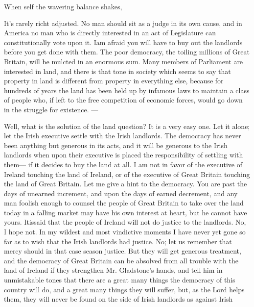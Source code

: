 \documentclass[11pt,openany]{book}
\begin{document}
When self the wavering balance shakes,

It's rarely richt adjusted. No man should sit as a judge in its own cause, and in America no man who is directly interested in an act of Legislature can constitutionally vote upon it. Iam afraid you will have to buy out the landlords before you get done with them. The poor democracy, the toiling millions of Great Britain, will be mulcted in an enormous sum. Many members of Parliament are interested in land, and there is that tone in society which seems to say that property in land is different from property in everything else, because for hundreds of years the land has been held up by infamous laws to maintain a class of people who, if left to the free competition of economic forces, would go down in the struggle for existence. ---

Well, what is the solution of the land question? It is a very easy one. Let it alone; let the Irish executive settle with the Irish landlords. The democracy has never been anything but generous in its acts, and it will be generous to the Irish landlords when upon their executive is placed the responsibility of settling with them--- if it decides to buy the land at all. I am not in favor of the executive of Ireland touching the land of Ireland, or of the executive of Great Britain touching the land of Great Britain. Let me give a hint to the democracy. You are past the days of unearned increment, and upon the days of earned decrement, and any man foolish enough to counsel the people of Great Britain to take over the land today in a falling market may have his own interest at heart, but he cannot have yours. Itissaid that the people of Ireland will not do justice to the landlords. No, I hope not. In my wildest and most vindictive moments I have never yet gone so far as to wish that the Irish landlords had justice. No; let us remember that mercy should in that case season justice. But they will get generous treatment, and the democracy of Great Britain can be absolved from all trouble with the land of Ireland if they strengthen Mr. Gladstone's hands, and tell him in unmistakable tones that there are a great many things the democracy of this country will do, and a great many things they will suffer, but, as the Lord helps them, they will never be found on the side of Irish landlords as against Irish
\end{document}

